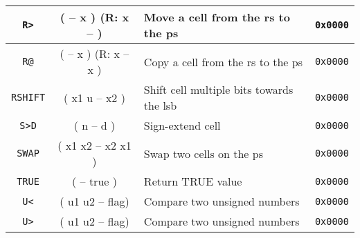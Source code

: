 \begin{center}
\begin{longtable}{|c|c|l|c|}
                                              
      \texttt{R>}                             &
      ( -- x ) (R: x -- )                     &
      Move a cell from the \gls{rs} to the \gls{ps} &
      \texttt{0x0000}                           \\ \hline
                                                         
      \texttt{R@}                             &
      ( -- x ) (R: x -- x )                   &
      Copy a cell from the \gls{rs} to the \gls{ps} &
      \texttt{0x0000}                           \\ \hline
                                                         
      \texttt{RSHIFT}                         &
      ( x1 u -- x2 )                          &
      Shift cell multiple bits towards the \gls{lsb} &
      \texttt{0x0000}                           \\ \hline

      \texttt{S>D}                            &
      ( n -- d )                              &
      Sign-extend cell                        &
      \texttt{0x0000}                           \\ \hline

      \texttt{SWAP}                           &
      ( x1 x2 -- x2 x1 )                      &
      Swap two cells on the \gls{ps}          &
      \texttt{0x0000}                           \\ \hline

      \texttt{TRUE}                           &
      ( -- true )                             &
      Return TRUE value                       &
      \texttt{0x0000}                           \\ \hline
                              
      \texttt{U<}                             &
      ( u1 u2 -- flag)                        &
      Compare two unsigned numbers            &
      \texttt{0x0000}                           \\ \hline
                              
      \texttt{U>}                             &
      ( u1 u2 -- flag)                        &
      Compare two unsigned numbers            &
      \texttt{0x0000}                           \\ \hline


\end{longtable}
\end{center}

